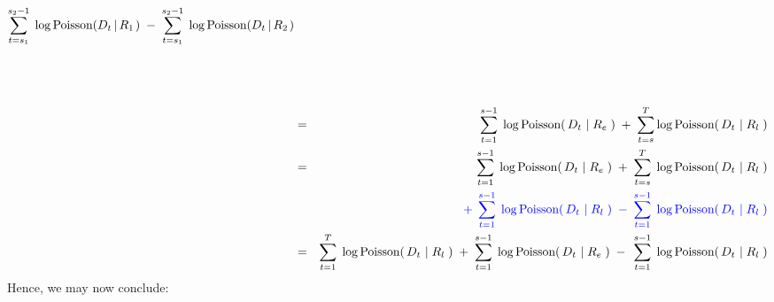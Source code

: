 \begin{eqnarray*}
	\overset{s_{2}-1}{\underset{t=s_{1}}{\sum}}\;
	\log \textnormal{Poisson}\!\left(D_{t} \left\vert\,R_{1}\right.\right)
	\; - \;
	\overset{s_{2}-1}{\underset{t=s_{1}}{\sum}}\;
	\log \textnormal{Poisson}\!\left(D_{t} \left\vert\,R_{2}\right.\right)
\\
\\
\\
\\
&=&
	\overset{s-1}{\underset{t=1}{\sum}}\;
	\log\textnormal{Poisson}\!\left(\,D_{t} \,\left\vert\; R_{e}\right.\,\right)
	\; + \;
	\overset{T}{\underset{t=s}{\sum}}
	\log\textnormal{Poisson}\!\left(\,D_{t} \,\left\vert\; R_{l}\right.\,\right)
\\
&=&
	{\color{white}+}\;\,
	\overset{s-1}{\underset{t=1}{\sum}}\;
	\log\textnormal{Poisson}\!\left(\,D_{t} \,\left\vert\; R_{e}\right.\,\right)
	\; + \;
	\overset{T}{\underset{t=s}{\sum}}\;
	\log\textnormal{Poisson}\!\left(\,D_{t} \,\left\vert\; R_{l}\right.\,\right)
\\
&&
	{\color{blue}
	+\;\,
	\overset{s-1}{\underset{t=1}{\sum}}\;
	\log\textnormal{Poisson}\!\left(\,D_{t} \,\left\vert\; R_{l}\right.\,\right)
	\; - \;
	\overset{s-1}{\underset{t=1}{\sum}}\;
	\log\textnormal{Poisson}\!\left(\,D_{t} \,\left\vert\; R_{l}\right.\,\right)
	}
\\
&=&
	\overset{T}{\underset{t=1}{\sum}}\;
	\log\textnormal{Poisson}\!\left(\,D_{t} \,\left\vert\; R_{l}\right.\,\right)
	\;+\;
	\overset{s-1}{\underset{t=1}{\sum}}\;
	\log\textnormal{Poisson}\!\left(\,D_{t} \,\left\vert\; R_{e}\right.\,\right)
		\;-\;\,
		\overset{s-1}{\underset{t=1}{\sum}}\;
		\log\textnormal{Poisson}\!\left(\,D_{t} \,\left\vert\; R_{l}\right.\,\right)
\end{eqnarray*}
Hence, we may now conclude:
